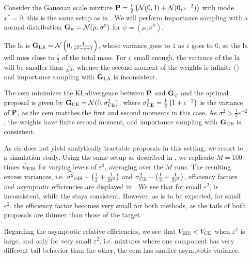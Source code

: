 \begin{example}
  \label{ex:la_failure}
  Consider the Gaussian scale mixture $\P = \frac{1}{2} \left(\mathcal N (0,1) + \mathcal N(0, \varepsilon^{-2})\right)$ with mode $x^{\ast}=0$, this is the same setup as in . We will perform importance sampling with a normal distribution $\G_{\psi} = \mathcal N (\mu, \sigma^{2})$ for $\psi = \left( \mu, \sigma^{2} \right)$.

  The \gls{la} is $\G_{\text{LA}} = \mathcal N \left( 0, \frac{1}{\varepsilon^{2} - \varepsilon + 1} \right)$, whose variance goes to $1$ as $\varepsilon$ goes to $0$, so the \gls{la} will miss close to $\frac 1 2$ of the total mass.
  For $\varepsilon$ small enough, the variance of the \gls{la} will be smaller than $\frac{1}{2\varepsilon^{2}}$, whence the second moment of the weights is infinite () and importance sampling with $\G_{\text{LA}}$ is inconsistent.

  The \gls{cem} minimizes the KL-divergence between $\P$ and $\G_{\psi}$ and the optimal proposal is given by $\G_{\text{CE}} = \mathcal N (0, \sigma_{\ce}^{2})$, where $\sigma_{\ce}^{2} = \frac{1}{2}\left( 1 + \varepsilon^{-2} \right)$ is the variance of $\P$, as the \acrshort{cem} matches the first and second moments in this case.
  As $\sigma^{2} > \frac{1}{2}\varepsilon^{-2}$, the weights have finite second moment, and importance sampling with $\G_{\ce}$ is consistent.

  As \Gls{eis} does not yield analytically tractable proposals in this setting, we resort to a simulation study. Using the same setup as described in , we replicate $M = 100$ times $\hpeis$ for varying levels of $\varepsilon^{2}$, averaging over the $M$ runs. The resulting excess variances, i.e. $\widehat{\sigma^{2}}_{\eis} - \left( \frac{1}{2} + \frac{1}{2 \varepsilon^{2}} \right)$ and $\sigma^{2}_{\ce} - \left( \frac{1}{2} + \frac{1}{2 \varepsilon^{2}} \right)$, efficiency factors and asymptotic efficiencies are displayed in . We see that for small $\varepsilon^{2}$, \aeis is inconsistent, while the \acem stays consistent. However, as is to be expected, for small $\varepsilon^{2}$, the efficiency factor becomes very small for both methods, as the tails of both proposals are thinner than those of the target.

  Regarding the asymptotic relative efficiencies, we see that $V_{\eis} < V_{\ce}$ when $\varepsilon^{2}$ is large, and only for very small $\varepsilon^{2}$, i.e. mixtures where one component has very different tail behavior than the other, the \acrshort{cem} has smaller asymptotic variance. 
    \begin{figure}
        \centering


\end{figure}
\end{example}
